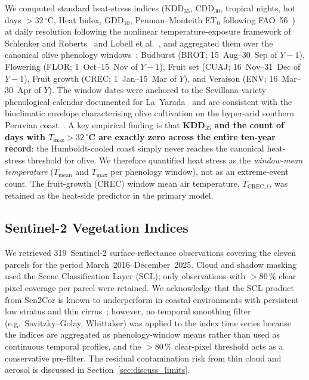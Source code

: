 \documentclass[agronomy,article,submit,pdftex,moreauthors]{Definitions/mdpi}
\begin{document}
We computed standard heat-stress indices (KDD$_{35}$, CDD$_{30}$, tropical nights, hot days $>32\,^\circ$C, Heat Index, GDD$_{10}$, Penman--Monteith ET$_{0}$ following FAO~56~\cite{allen1998fao56}) at daily resolution following the nonlinear temperature-exposure framework of Schlenker and Roberts~\cite{schlenker2009nonlinear} and Lobell et al.~\cite{lobell2011climate}, and aggregated them over the canonical olive phenology windows~\cite{oteros2014,rallo2013,benlloch2018}: Budburst (BROT; 15~Aug--30~Sep of $Y-1$), Flowering (FLOR; 1~Oct--15~Nov of $Y-1$), Fruit set (CUAJ; 16~Nov--31~Dec of $Y-1$), Fruit growth (CREC; 1~Jan--15~Mar of $Y$), and Veraison (ENV; 16~Mar--30~Apr of $Y$). The window dates were anchored to the Sevillana-variety phenological calendar documented for La~Yarada~\cite{machaca2022olive,larico2019olive} and are consistent with the bioclimatic envelope characterising olive cultivation on the hyper-arid southern Peruvian coast~\cite{tonconi2014olive,pinovargas2022enso}. A key empirical finding is that \textbf{KDD$_{35}$ and the count of days with $T_{\max}>32\,^\circ$C are exactly zero across the entire ten-year record}: the Humboldt-cooled coast simply never reaches the canonical heat-stress threshold for olive. We therefore quantified heat stress as the \emph{window-mean temperature} ($T_{\text{mean}}$ and $T_{\max}$ per phenology window), not as an extreme-event count. The fruit-growth (CREC) window mean air temperature, $T_{\text{CREC},t}$, was retained as the heat-side predictor in the primary model.

\subsection{Sentinel-2 Vegetation Indices}
\label{sec:s2_vis}

We retrieved 319~Sentinel-2 surface-reflectance observations covering the eleven parcels for the period March~2016--December~2025. Cloud and shadow masking used the Scene Classification Layer (SCL); only observations with $>80\,\%$ clear pixel coverage per parcel were retained. We acknowledge that the SCL product from Sen2Cor is known to underperform in coastal environments with persistent low stratus and thin cirrus~\cite{baetens2019,coluzzi2018}; however, no temporal smoothing filter (e.g.\ Savitzky--Golay, Whittaker) was applied to the index time series because the indices are aggregated as phenology-window means rather than used as continuous temporal profiles, and the $>80\,\%$ clear-pixel threshold acts as a conservative pre-filter. The residual contamination risk from thin cloud and aerosol is discussed in Section~\ref{sec:discuss_limits}.
\end{document}
